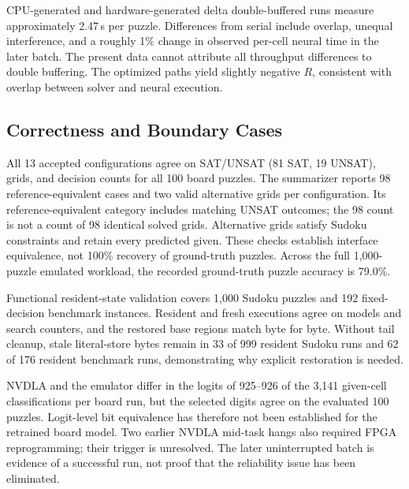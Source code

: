 CPU-generated and hardware-generated delta double-buffered runs measure approximately 2.47\,s per puzzle. Differences from serial include overlap, unequal interference, and a roughly 1\% change in observed per-cell neural time in the later batch. The present data cannot attribute all throughput differences to double buffering. The optimized paths yield slightly negative $R$, consistent with overlap between solver and neural execution.

\subsection{Correctness and Boundary Cases}
All 13 accepted configurations agree on SAT/UNSAT (81 SAT, 19 UNSAT), grids, and decision counts for all 100 board puzzles. The summarizer reports 98 reference-equivalent cases and two valid alternative grids per configuration. Its reference-equivalent category includes matching UNSAT outcomes; the 98 count is not a count of 98 identical solved grids. Alternative grids satisfy Sudoku constraints and retain every predicted given. These checks establish interface equivalence, not 100\% recovery of ground-truth puzzles. Across the full 1,000-puzzle emulated workload, the recorded ground-truth puzzle accuracy is 79.0\%.

Functional resident-state validation covers 1,000 Sudoku puzzles and 192 fixed-decision benchmark instances. Resident and fresh executions agree on models and search counters, and the restored base regions match byte for byte. Without tail cleanup, stale literal-store bytes remain in 33 of 999 resident Sudoku runs and 62 of 176 resident benchmark runs, demonstrating why explicit restoration is needed.

NVDLA and the emulator differ in the logits of 925--926 of the 3,141 given-cell classifications per board run, but the selected digits agree on the evaluated 100 puzzles. Logit-level bit equivalence has therefore not been established for the retrained board model. Two earlier NVDLA mid-task hangs also required FPGA reprogramming; their trigger is unresolved. The later uninterrupted batch is evidence of a successful run, not proof that the reliability issue has been eliminated.

